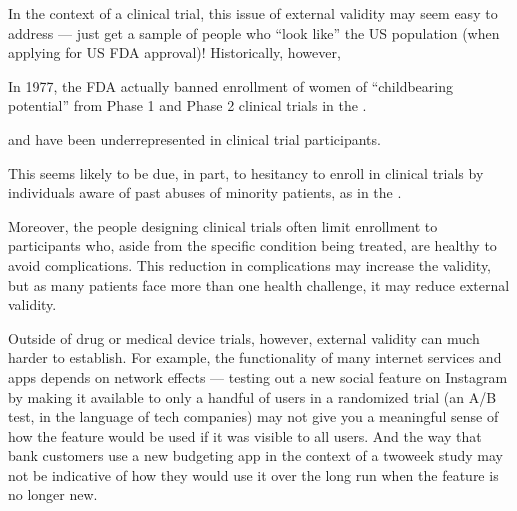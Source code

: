 \documentclass[letterpaper,10pt,english]{jupyterBook}
\begin{document}
\sphinxAtStartPar
In the context of a clinical trial, this issue of external validity may seem easy to address — just get a sample of people who “look like” the US population (when applying for US FDA approval)! Historically, however, %
\begin{footnote}[1]\sphinxAtStartFootnote
In 1977, the FDA actually banned enrollment of women of “childbearing potential” from Phase 1 and Phase 2 clinical trials in the .
%
\end{footnote} and  have been underrepresented in clinical trial participants.%
\begin{footnote}[2]\sphinxAtStartFootnote
This seems likely to be due, in part, to hesitancy to enroll in clinical trials by individuals aware of past abuses of minority patients, as in the .
%
\end{footnote} Moreover, the people designing clinical trials often limit enrollment to participants who, aside from the specific condition being treated, are healthy to avoid complications. This reduction in complications may increase the  validity, but as many patients face more than one health challenge, it may reduce external validity.

\sphinxAtStartPar
Outside of drug or medical device trials, however, external validity can much harder to establish. For example, the functionality of many internet services and apps depends on network effects — testing out a new social feature on Instagram by making it available to only a handful of users in a randomized trial (an A/B test, in the language of tech companies) may not give you a meaningful sense of how the feature would be used if it was visible to all users. And the way that bank customers use a new budgeting app in the context of a two\sphinxhyphen{}week study may not be indicative of how they would use it over the long run when the feature is no longer new.
\end{document}
